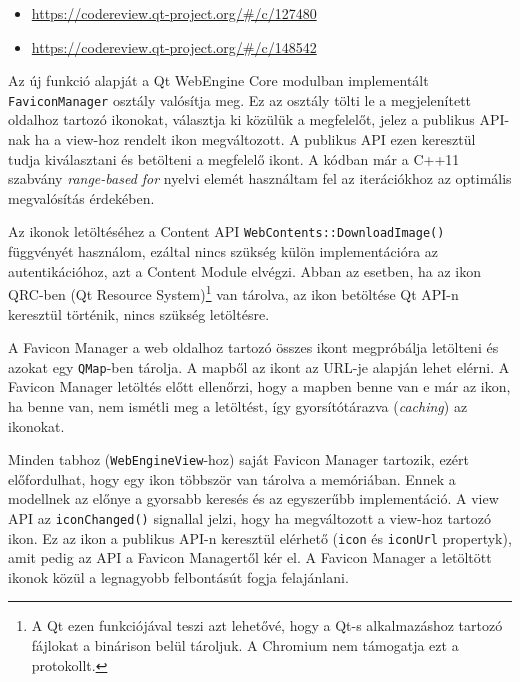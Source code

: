 \documentclass[12pt]{report}
\let\origurl\url
\renewcommand{\url}[1]{%
    \textcolor{blue}{\origurl{#1}}
}
\newcommand{\gerrit}[1]{%
    \textcolor{qtgreen}{\origurl{https://codereview.qt-project.org/\#/c/#1}}
}
\begin{document}
\newpage

\begin{center}
    \begin{reviewbox}
        \begin{itemize}
            \renewcommand{\labelitemi}{\textcolor{qtgreen}{$\blacktriangleright$}}
            \item \gerrit{127480}
            \item \gerrit{148542}
        \end{itemize}
    \end{reviewbox}
\end{center}

Az új funkció alapját a Qt WebEngine Core modulban implementált \texttt{FaviconManager}
osztály valósítja meg. Ez az osztály tölti le a megjelenített oldalhoz tartozó ikonokat,
választja ki közülük a megfelelőt, jelez a publikus API-nak ha a view-hoz rendelt ikon
megváltozott. A publikus API ezen keresztül tudja kiválasztani és betölteni a megfelelő ikont.
A kódban már a C++11 szabvány \textit{range-based for} nyelvi elemét használtam fel az
iterációkhoz az optimális megvalósítás érdekében.

Az ikonok letöltéséhez a Content API \texttt{WebContents::DownloadImage()} függvényét
használom, ezáltal nincs szükség külön implementációra az autentikációhoz, azt a Content
Module elvégzi. Abban az esetben, ha az ikon QRC-ben (Qt Resource System)\footnote{A Qt ezen
    funkciójával teszi azt lehetővé, hogy a Qt-s alkalmazáshoz tartozó fájlokat a
    binárison belül tároljuk. A Chromium nem támogatja ezt a protokollt.}
van tárolva, az ikon betöltése Qt API-n keresztül történik, nincs szükség letöltésre.

A Favicon Manager a web oldalhoz tartozó összes ikont megpróbálja letölteni és azokat egy
\texttt{QMap}-ben tárolja. A mapből az ikont az URL-je alapján lehet elérni. A Favicon
Manager letöltés előtt ellenőrzi, hogy a mapben benne van e már az ikon, ha benne van,
nem ismétli meg a letöltést, így gyorsítótárazva (\textit{caching}) az ikonokat.

Minden tabhoz (\texttt{WebEngineView}-hoz) saját Favicon Manager tartozik, ezért
előfordulhat, hogy egy ikon többször van tárolva a memóriában. Ennek a modellnek az előnye
a gyorsabb keresés és az egyszerűbb implementáció. A view API az \texttt{iconChanged()}
signallal jelzi, hogy ha megváltozott a view-hoz tartozó ikon. Ez az ikon a publikus API-n
keresztül elérhető (\texttt{icon} és \texttt{iconUrl} propertyk), amit pedig az API a
Favicon Managertől kér el. A Favicon Manager a letöltött ikonok közül a legnagyobb
felbontásút fogja felajánlani.
\end{document}
